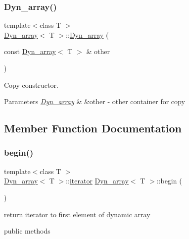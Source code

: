 \subsubsection{\texorpdfstring{Dyn\+\_\+array()}{Dyn\_array()}\hspace{0.1cm}{\footnotesize\ttfamily [6/6]}}
{\footnotesize\ttfamily template$<$class T $>$ \\
\hyperlink{classDyn__array}{Dyn\+\_\+array}$<$ T $>$\+::\hyperlink{classDyn__array}{Dyn\+\_\+array} (\begin{DoxyParamCaption}\item[{const \hyperlink{classDyn__array}{Dyn\+\_\+array}$<$ T $>$ \&}]{other }\end{DoxyParamCaption})}



Copy constructor. 


\begin{DoxyParams}{Parameters}
{\em \hyperlink{classDyn__array}{Dyn\+\_\+array}} & \&other -\/ other container for copy \\
\hline
\end{DoxyParams}


\subsection{Member Function Documentation}
\mbox{\label{classDyn__array_ad6191fc9efb3505a13de70bc0cc5db3e}} 
\subsubsection{\texorpdfstring{begin()}{begin()}}
{\footnotesize\ttfamily template$<$class T $>$ \\
\hyperlink{classDyn__array}{Dyn\+\_\+array}$<$ T $>$\+::\hyperlink{classDyn__array_1_1iterator}{iterator} \hyperlink{classDyn__array}{Dyn\+\_\+array}$<$ T $>$\+::begin (\begin{DoxyParamCaption}{ }\end{DoxyParamCaption})}



return iterator to first element of dynamic array 

public methods \mbox{\label{classDyn__array_a36c5289ec13ee40366fe3b095b2347bf}} 
